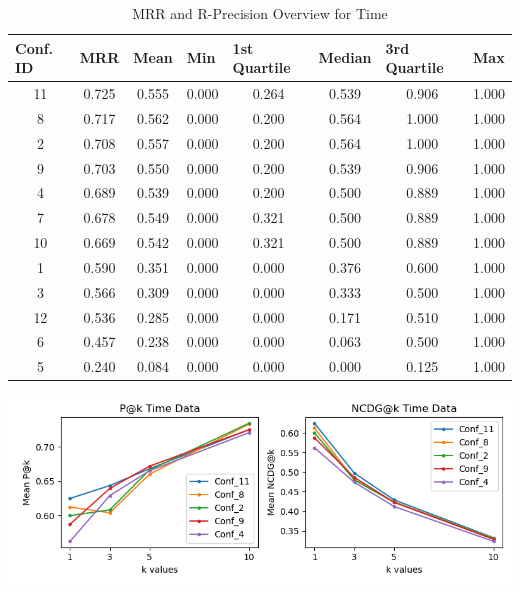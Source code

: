\documentclass[10pt]{article}
\begin{document}
\begin{table}[H]
\centering
\begin{tabular}{|c|c|c|c|c|c|c|c|}
\hline
\multicolumn{1}{|l|}{\textbf{Conf. ID}} &
  \multicolumn{1}{l|}{\textbf{MRR}} &
  \multicolumn{1}{l|}{\textbf{Mean}} &
  \multicolumn{1}{l|}{\textbf{Min}} &
  \multicolumn{1}{l|}{\textbf{1st Quartile}} &
  \multicolumn{1}{l|}{\textbf{Median}} &
  \multicolumn{1}{l|}{\textbf{3rd Quartile}} &
  \multicolumn{1}{l|}{\textbf{Max}} \\ \hline
11 & 0.725 & 0.555 & 0.000 & 0.264 & 0.539 & 0.906 & 1.000 \\ \hline
8  & 0.717 & 0.562 & 0.000 & 0.200 & 0.564 & 1.000 & 1.000 \\ \hline
2  & 0.708 & 0.557 & 0.000 & 0.200 & 0.564 & 1.000 & 1.000 \\ \hline
9  & 0.703 & 0.550 & 0.000 & 0.200 & 0.539 & 0.906 & 1.000 \\ \hline
4  & 0.689 & 0.539 & 0.000 & 0.200 & 0.500 & 0.889 & 1.000 \\ \hline
7  & 0.678 & 0.549 & 0.000 & 0.321 & 0.500 & 0.889 & 1.000 \\ \hline
10 & 0.669 & 0.542 & 0.000 & 0.321 & 0.500 & 0.889 & 1.000 \\ \hline
1  & 0.590 & 0.351 & 0.000 & 0.000 & 0.376 & 0.600 & 1.000 \\ \hline
3  & 0.566 & 0.309 & 0.000 & 0.000 & 0.333 & 0.500 & 1.000 \\ \hline
12 & 0.536 & 0.285 & 0.000 & 0.000 & 0.171 & 0.510 & 1.000 \\ \hline
6  & 0.457 & 0.238 & 0.000 & 0.000 & 0.063 & 0.500 & 1.000 \\ \hline
5  & 0.240 & 0.084 & 0.000 & 0.000 & 0.000 & 0.125 & 1.000 \\ \hline
\end{tabular}
\caption{MRR and R-Precision Overview for Time}
\label{tab:my-table}
\end{table}

\begin{center}
\includegraphics[scale=.85]{TimePlot.png}
\end{center}
\end{document}
